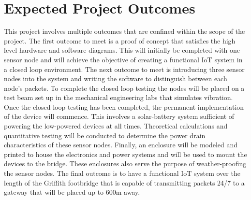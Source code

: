 \section{Expected Project Outcomes}
This project involves multiple outcomes that are confined within the scope of the project. The first outcome to meet is a proof of concept that satisfies the high level hardware and software diagrams. This will initially be completed with one sensor node and will achieve the objective of creating a functional IoT system in a closed loop environment. The next outcome to meet is introducing three sensor nodes into the system and writing the software to distinguish between each node's packets. To complete the closed loop testing the nodes will be placed on a test beam set up in the mechanical engineering labs that simulates vibration. Once the closed loop testing has been completed, the permanent implementation of the device will commence. This involves a solar-battery system sufficient of powering the low-powered devices at all times. Theoretical calculations and quantitative testing will be conducted to determine the power drain characteristics of these sensor nodes. Finally, an enclosure will be modeled and printed to house the electronics and power systems and will be used to mount the devices to the bridge. These enclosures also serve the purpose of weather-proofing the sensor nodes. The final outcome is to have a functional IoT system over the length of the Griffith footbridge that is capable of transmitting packets 24/7 to a gateway that will be placed up to 600m away. 
